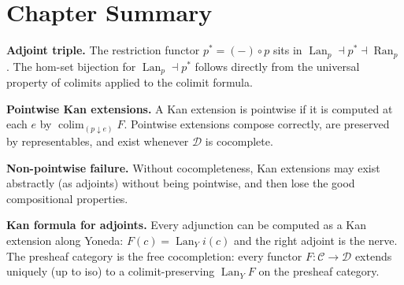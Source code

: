 \begin{exercisesbox}
\begin{qa}
\end{qa}
\end{exercisesbox}


\section*{Chapter Summary}

\begin{summarybox}
\textbf{Adjoint triple.} The restriction functor $p^* = (-) \circ p$ sits in
$\operatorname{Lan}_p \dashv p^* \dashv \operatorname{Ran}_p$. The hom-set bijection
for $\operatorname{Lan}_p \dashv p^*$ follows directly from the universal property
of colimits applied to the colimit formula.

\textbf{Pointwise Kan extensions.} A Kan extension is pointwise if it is
computed at each $e$ by $\operatorname{colim}_{(p \downarrow e)} F$. Pointwise
extensions compose correctly, are preserved by representables, and exist whenever
$\mathcal{D}$ is cocomplete.

\textbf{Non-pointwise failure.} Without cocompleteness, Kan extensions may exist
abstractly (as adjoints) without being pointwise, and then lose the good
compositional properties.

\textbf{Kan formula for adjoints.} Every adjunction can be computed as a Kan
extension along Yoneda: $F(c) = \operatorname{Lan}_Y i (c)$ and the right
adjoint is the nerve. The presheaf category is the free cocompletion: every
functor $F : \mathcal{C} \to \mathcal{D}$ extends uniquely (up to iso) to a
colimit-preserving $\operatorname{Lan}_Y F$ on the presheaf category.
\end{summarybox}


